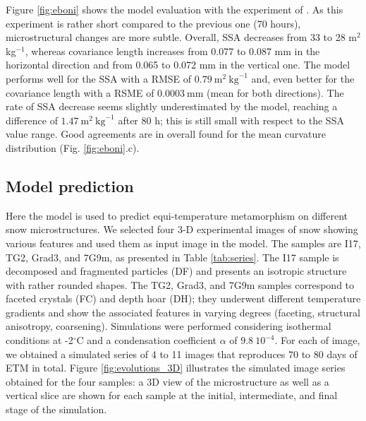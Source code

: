 \documentclass[draft,ms]{agujournal2019}
\begin{document}
Figure \ref{fig:eboni} shows the model evaluation with the experiment of . As this experiment is rather short compared to the previous one (70 hours), microstructural changes are more subtle. Overall, SSA decreases from 33 to 28 m$^2$ kg$^{-1}$, whereas covariance length increases from 0.077 to 0.087 mm in the horizontal direction and from 0.065 to 0.072 mm in the vertical one. The model performs well for the SSA with a RMSE of $0.79\ \mathrm{m}^2\ \mathrm{kg}^{-1}$ and, even better for the covariance length with a RSME of $0.0003\ \mathrm{mm}$ (mean for both directions).
The rate of SSA decrease seems slightly underestimated by the model, reaching a difference of $1.47\ \mathrm{m}^2\ \mathrm{kg}^{-1}$ after 80 h; this is still small with respect to the SSA value range. Good agreements are in overall found for the mean curvature distribution (Fig. \ref{fig:eboni}.c). \\


\subsection{Model prediction}
\label{sec:prediction}

Here the model is used to predict equi-temperature metamorphism on different snow microstructures. We selected four 3-D experimental images of snow showing various features and used them as input image in the model. The samples are I17, TG2, Grad3, and 7G9m, as presented in Table \ref{tab:series}.
The I17 sample is decomposed and fragmented particles (DF) and presents an isotropic structure with rather rounded shapes. The TG2, Grad3, and 7G9m samples correspond to faceted crystals (FC) and depth hoar (DH); they underwent different temperature gradients and show the associated features in varying degrees (faceting, structural anisotropy, coarsening). Simulations were performed considering isothermal conditions at -2$^\circ$C and a condensation coefficient $\alpha$ of $9.8\ 10^{-4}$. For each of image, we obtained a simulated series of 4 to 11 images that reproduces 70 to 80 days of ETM in total.
Figure \ref{fig:evolutions_3D} illustrates the simulated image series obtained for the four samples: a 3D view of the microstructure as well as a vertical slice are shown for each sample at the initial, intermediate, and final stage of the simulation.\\
\end{document}
